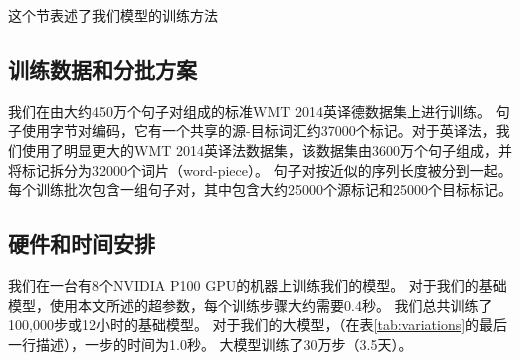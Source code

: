 
这个节表述了我们模型的训练方法


\subsection{训练数据和分批方案}
我们在由大约450万个句子对组成的标准WMT 2014英译德数据集上进行训练。 句子使用字节对编码\citep{DBLP:journals/corr/BritzGLL17}，它有一个共享的源-目标词汇约37000个标记。对于英译法，我们使用了明显更大的WMT 2014英译法数据集，该数据集由3600万个句子组成，并将标记拆分为32000个词片（word-piece）\citep{wu2016google}。 句子对按近似的序列长度被分到一起。 每个训练批次包含一组句子对，其中包含大约25000个源标记和25000个目标标记。  

\subsection{硬件和时间安排}


我们在一台有8个NVIDIA P100 GPU的机器上训练我们的模型。 对于我们的基础模型，使用本文所述的超参数，每个训练步骤大约需要0.4秒。 我们总共训练了100,000步或12小时的基础模型。 对于我们的大模型，（在表\ref{tab:variations}的最后一行描述），一步的时间为1.0秒。 大模型训练了30万步（3.5天）。

